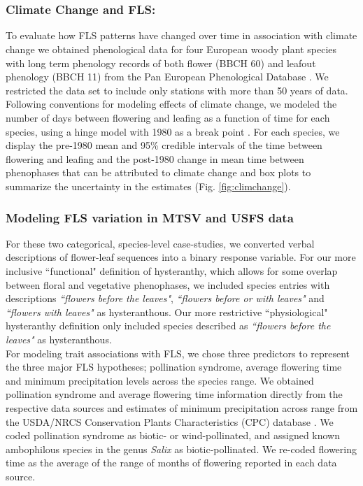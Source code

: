 \documentclass[11pt]{article}
\begin{document}
\pagebreak[4]

\section*{}\label{Methods S1}

\subsubsection*{Climate Change and FLS:}
\noindent To evaluate how FLS patterns have changed over time in association with climate change we obtained phenological data for four European woody plant species with long term phenology records of both flower (BBCH 60) and leafout phenology (BBCH 11) from the Pan European Phenological Database \citep{PEP725}. We restricted the data set to include only stations with more than 50 years of data. Following conventions for modeling effects of climate change, we modeled the number of days between flowering and leafing as a function of time for each species, using a hinge model with 1980 as a break point \citep{IPCC2013,Kharouba2018}. For each species, we display the pre-1980 mean and 95\% credible intervals of the time between flowering and leafing and the post-1980 change in mean time between phenophases that can be attributed to climate change and box plots to summarize the uncertainty in the estimates (Fig. \ref{fig:climchange}).

\subsubsection*{Modeling FLS variation in MTSV and USFS data}
\noindent For these two categorical, species-level case-studies, we converted verbal descriptions of flower-leaf sequences into a binary response variable. For our more inclusive ``functional" definition of hysteranthy, which allows for some overlap between floral and vegetative phenophases, we included species entries with descriptions \textit{``flowers before the leaves"}, \textit{``flowers before or with leaves"} and \textit{``flowers with leaves"} as hysteranthous. Our more restrictive ``physiological" hysteranthy definition only included species described as \textit{``flowers before the leaves"} as hysteranthous.\\

\noindent For modeling trait associations with FLS, we chose three predictors to represent the three major FLS hypotheses; pollination syndrome, average flowering time and minimum precipitation levels across the species range. We obtained pollination syndrome and average flowering time information directly from the respective data sources and estimates of minimum precipitation across range from the USDA/NRCS Conservation Plants Characteristics (CPC) database \citep{usdancrs}. We coded pollination syndrome as biotic- or wind-pollinated, and assigned known ambophilous species in the genus \textit{Salix} as biotic-pollinated. We re-coded flowering time as the average of the range of months of flowering reported in each data source.\\
\end{document}
